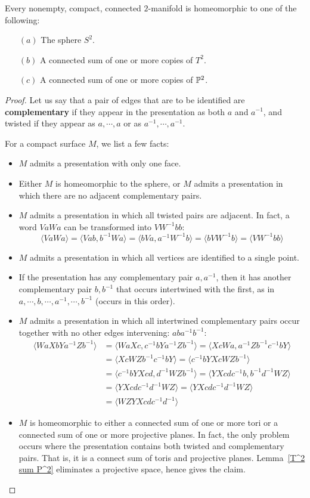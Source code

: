 \begin{theorem}
Every nonempty, compact, connected $2$-manifold is homeomorphic to one of the following:
\begin{itemize}
\item[$(a)$] The sphere $S^2$.
\item[$(b)$] A connected sum of one or more copies of $T^2$.
\item[$(c)$] A connected sum of one or more copies of $\P^2$.
\end{itemize}
\end{theorem}
\begin{proof}
Let us say that a pair of edges that are to be identified are \textbf{complementary} if they appear in the presentation as both $a$ and $a^{-1}$, and twisted if they appear as $a,\cdots,a$ or as $a^{-1},\cdots,a^{-1}$.\par
For a compact surface $M$, we list a few facts:
\begin{itemize}
\item $M$ admits a presentation with only one face.
\item Either $M$ is homeomorphic to the sphere, or $M$ admits a presentation in which there are no adjacent complementary pairs.
\item $M$ admits a presentation in which all twisted pairs are adjacent. In fact, a word $VaWa$ can be transformed into $VW^{-1}bb$:
\[\langle VaWa\rangle=\langle Vab,b^{-1}Wa\rangle=\langle bVa,a^{-1}W^{-1}b\rangle=\langle bVW^{-1}b\rangle=\langle VW^{-1}bb\rangle\]
\item $M$ admits a presentation in which all vertices are identified to a single point.
\item If the presentation has any complementary pair $a,a^{-1}$, then it has
another complementary pair $b,b^{-1}$ that occurs intertwined with the first, as in $a,\cdots,b,\cdots,a^{-1},\cdots,b^{-1}$ (occurs in this order).
\item $M$ admits a presentation in which all intertwined complementary pairs occur together with no other edges intervening: $aba^{-1}b^{-1}$:
\begin{align*}
\langle WaXbYa^{-1}Zb^{-1}\rangle&=\langle WaXc,c^{-1}bYa^{-1}Zb^{-1}\rangle=\langle XcWa,a^{-1}Zb^{-1}c^{-1}bY\rangle\\
&=\langle XcWZb^{-1}c^{-1}bY\rangle=\langle c^{-1}bYXcWZb^{-1}\rangle\\
&=\langle c^{-1}bYXcd,d^{-1}WZb^{-1}\rangle=\langle YXcdc^{-1}b,b^{-1}d^{-1}WZ\rangle\\
&=\langle YXcdc^{-1}d^{-1}WZ\rangle=\langle YXcdc^{-1}d^{-1}WZ\rangle\\
&=\langle WZYXcdc^{-1}d^{-1}\rangle
\end{align*}
\item $M$ is homeomorphic to either a connected sum of one or more tori or a connected sum of one or more projective planes. In fact, the only problem occurs where the presentation contains both twisted
and complementary pairs. That is, it is a connect sum of toris and projective planes. Lemma~\ref{T^2 sum P^2} eliminates a projective space, hence gives the claim.
\end{itemize}
\end{proof}
